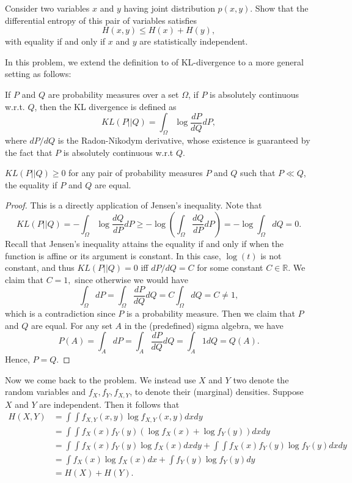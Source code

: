 \begin{cBoxA}{}
 Consider two variables $x$ and $y$ having joint distribution $p(x,y)$.
Show that the differential entropy of this pair of variables satisfies
\[
H(x,y)\leq H(x)+H(y),
\]
with equality if and only if $x$ and $y$ are statistically independent. 
\end{cBoxA}

In this problem, we extend the definition to of KL-divergence to a
more general setting as follows:
\begin{defn}
If $P$ and $Q$ are probability measures over a set $\Omega$, if
$P$ is absolutely continuous w.r.t. $Q$, then the KL divergence
is defined as 
\[
KL(P||Q)=\int_{\Omega}\log\frac{dP}{dQ}dP,
\]
where $dP/dQ$ is the Radon-Nikodym derivative, whose existence is
guaranteed by the fact that $P$ is absolutely continuous w.r.t $Q$. 
\end{defn}
\begin{lem}
$KL(P||Q)\geq0$ for any pair\label{lem: KL divergence eq} of probability
measures $P$ and $Q$ such that $P\ll Q$, the equality if $P$ and
$Q$ are equal. 
\end{lem}
\begin{proof}
This is a directly application of Jensen's inequality. Note that 
\[
KL(P||Q)=-\int_{\Omega}\log\frac{dQ}{dP}dP\geq-\log\left(\int_{\Omega}\frac{dQ}{dP}dP\right)=-\log\int_{\Omega}dQ=0.
\]
Recall that Jensen's inequality attains the equality if and only if
when the function is affine or its argument is constant. In this case,
$\log(t)$ is not constant, and thus $KL(P||Q)=0$ iff $dP/dQ=C$
for some constant $C\in\mathbb{R}$. We claim that $C=1,$ since otherwise
we would have 
\[
\int_{\Omega}dP=\int_{\Omega}\frac{dP}{dQ}dQ=C\int_{\Omega}dQ=C\neq1,
\]
which is a contradiction since $P$ is a probability measure. Then
we claim that $P$ and $Q$ are equal. For any set $A$ in the (predefined)
sigma algebra, we have 
\[
P(A)=\int_{A}dP=\int_{A}\frac{dP}{dQ}dQ=\int_{A}1dQ=Q(A).
\]
Hence, $P=Q.$ 
\end{proof}
Now we come back to the problem. We instead use $X$ and $Y$ two
denote the random variables and $f_{X},f_{Y},f_{X,Y}$, to denote
their (marginal) densities. Suppose $X$ and $Y$ are independent.
Then it follows that 
\begin{align*}
H(X,Y) & =\int\int f_{X,Y}(x,y)\log f_{X,Y}(x,y)dxdy\\
 & =\int\int f_{X}(x)f_{Y}(y)(\log f_{X}(x)+\log f_{Y}(y))dxdy\\
 & =\int\int f_{X}(x)f_{Y}(y)\log f_{X}(x)dxdy+\int\int f_{X}(x)f_{Y}(y)\log f_{Y}(y)dxdy\\
 & =\int f_{X}(x)\log f_{X}(x)dx+\int f_{Y}(y)\log f_{Y}(y)dy\\
 & =H(X)+H(Y).
\end{align*}

